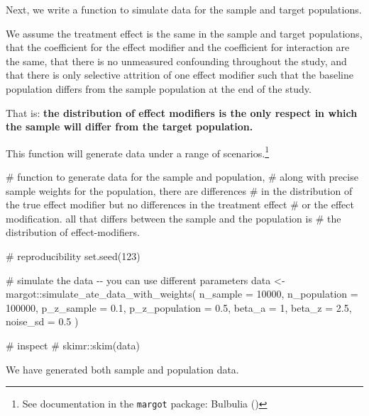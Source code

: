 \documentclass[
  single column]{article}
\newenvironment{Shaded}{\begin{snugshade}}{\end{snugshade}}
\newcommand{\AttributeTok}[1]{\textcolor[rgb]{0.40,0.45,0.13}{#1}}
\newcommand{\CommentTok}[1]{\textcolor[rgb]{0.37,0.37,0.37}{#1}}
\newcommand{\DecValTok}[1]{\textcolor[rgb]{0.68,0.00,0.00}{#1}}
\newcommand{\FloatTok}[1]{\textcolor[rgb]{0.68,0.00,0.00}{#1}}
\newcommand{\FunctionTok}[1]{\textcolor[rgb]{0.28,0.35,0.67}{#1}}
\newcommand{\NormalTok}[1]{\textcolor[rgb]{0.00,0.23,0.31}{#1}}
\newcommand{\OtherTok}[1]{\textcolor[rgb]{0.00,0.23,0.31}{#1}}
\newcommand{\SpecialCharTok}[1]{\textcolor[rgb]{0.37,0.37,0.37}{#1}}
\begin{document}
Next, we write a function to simulate data for the sample and target
populations.

We assume the treatment effect is the same in the sample and target
populations, that the coefficient for the effect modifier and the
coefficient for interaction are the same, that there is no unmeasured
confounding throughout the study, and that there is only selective
attrition of one effect modifier such that the baseline population
differs from the sample population at the end of the study.

That is: \textbf{the distribution of effect modifiers is the only
respect in which the sample will differ from the target population.}

This function will generate data under a range of scenarios.\footnote{See
  documentation in the \texttt{margot} package: Bulbulia
  ()}

\begin{Shaded}
\begin{Highlighting}[]
\CommentTok{\# function to generate data for the sample and population, }
\CommentTok{\# along with precise sample weights for the population, there are differences }
\CommentTok{\# in the distribution of the true effect modifier but no differences in the treatment effect }
\CommentTok{\# or the effect modification. all that differs between the sample and the population is }
\CommentTok{\# the distribution of effect{-}modifiers.}

\CommentTok{\# reproducibility}
\FunctionTok{set.seed}\NormalTok{(}\DecValTok{123}\NormalTok{)}

\CommentTok{\# simulate the data {-}{-} you can use different parameters}
\NormalTok{data }\OtherTok{\textless{}{-}}\NormalTok{ margot}\SpecialCharTok{::}\FunctionTok{simulate\_ate\_data\_with\_weights}\NormalTok{(}
  \AttributeTok{n\_sample =} \DecValTok{10000}\NormalTok{,}
  \AttributeTok{n\_population =} \DecValTok{100000}\NormalTok{,}
  \AttributeTok{p\_z\_sample =} \FloatTok{0.1}\NormalTok{,}
  \AttributeTok{p\_z\_population =} \FloatTok{0.5}\NormalTok{,}
  \AttributeTok{beta\_a =} \DecValTok{1}\NormalTok{,}
  \AttributeTok{beta\_z =} \FloatTok{2.5}\NormalTok{,}
  \AttributeTok{noise\_sd =} \FloatTok{0.5}
\NormalTok{)}

\CommentTok{\# inspect}
\CommentTok{\# skimr::skim(data)}
\end{Highlighting}
\end{Shaded}

We have generated both sample and population data.
\end{document}
